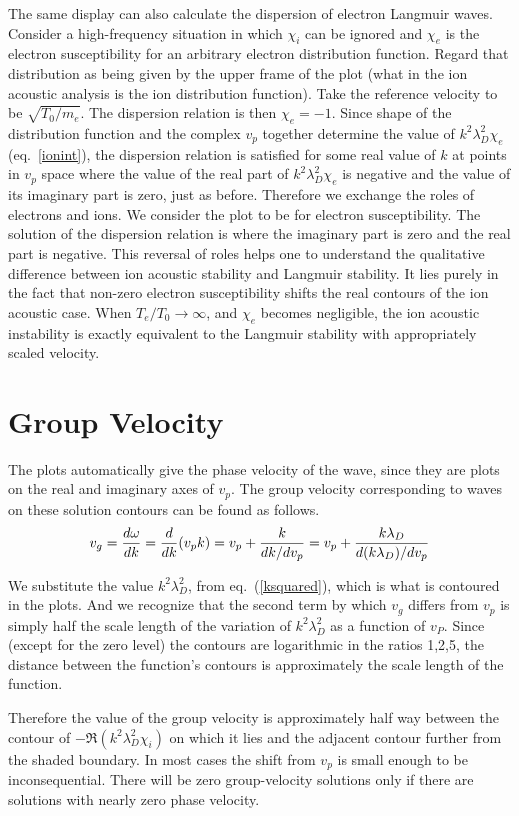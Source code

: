 \documentclass[12pt]{article}
\begin{document}
The same display can also calculate the dispersion of electron
Langmuir waves. Consider a high-frequency situation in which $\chi_i$
can be ignored and $\chi_e$ is the electron susceptibility for an
arbitrary electron distribution function. Regard that distribution as
being given by the upper frame of the plot (what in the ion acoustic
analysis is the ion distribution function). Take the reference
velocity to be $\sqrt{T_0/m_e}$. The dispersion relation is then
$\chi_e=-1$. Since shape of the distribution function and the complex
$v_p$ together determine the value of $k^2\lambda_D^2 \chi_e$ (eq.\
\ref{ionint}), the dispersion relation is satisfied for some real
value of $k$ at points in $v_p$ space where the value of the real part
of $k^2\lambda_D^2 \chi_e$ is negative and the value of its imaginary
part is zero, just as before.  Therefore we exchange the roles of
electrons and ions. We consider the plot to be for electron
susceptibility. The solution of the dispersion relation is where the
imaginary part is zero and the real part is negative. This reversal of
roles helps one to understand the qualitative difference between ion
acoustic stability and Langmuir stability. It lies purely in the fact
that non-zero electron susceptibility shifts the real contours of the
ion acoustic case. When $T_e/T_0\to\infty$, and $\chi_e$ becomes
negligible, the ion acoustic instability is exactly equivalent to the
Langmuir stability with appropriately scaled velocity.


\section{Group Velocity}

The plots automatically give the phase velocity of the wave, since
they are plots on the real and imaginary axes of $v_p$. The group
velocity corresponding to waves on these solution contours can be
found as follows.
\begin{equation}
  \label{vgroup}
  v_g = {d\omega\over dk} = {d\over dk}(v_p k) = v_p + {k\over
    dk/dv_p} = v_p + {k\lambda_{D}\over d(k\lambda_{D})/dv_p}
\end{equation}

We substitute the value $k^2\lambda_{D}^2$, from eq.\
(\ref{ksquared}), which is what is contoured in the plots. And we
recognize that the second term by which $v_g$ differs from $v_p$ is
simply half the scale length of the variation of $k^2\lambda_{D}^2$ as
a function of $v_P$. Since (except for the zero level) the contours
are logarithmic in the ratios 1,2,5, the distance between the
function's contours is approximately the scale length of the function.


Therefore the value of the group velocity is approximately half way
between the contour of $-\Re (k^2\lambda_{D}^2 \chi_i)$ on which
it lies and the adjacent contour further from the shaded boundary. In
most cases the shift from $v_p$ is small enough to be inconsequential.
There will be zero group-velocity solutions only if there are
solutions with nearly zero phase velocity.
\end{document}
